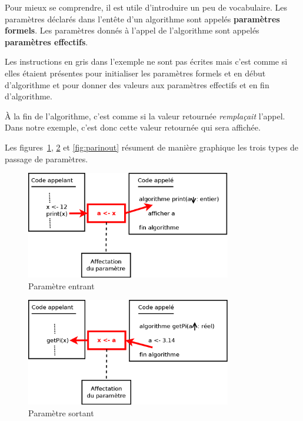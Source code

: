 	Pour mieux se comprendre,
	il est utile d’introduire un peu de vocabulaire.
	Les paramètres déclarés dans l’entête d’un algorithme
	sont appelés \textbf{paramètres formels}.
	Les paramètres donnés à l’appel de l’algorithme
	sont appelés \textbf{paramètres effectifs}. 
	
	Les instructions en gris dans l’exemple ne sont pas écrites
	mais c’est comme si elles étaient présentes
	pour initialiser les paramètres formels \In{} et \InOut{}
	en début d’algorithme
	et pour donner des valeurs 
	aux paramètres effectifs \Out{} et \InOut{}
	en fin d’algorithme.
	
	À la fin de l’algorithme, 
	c’est comme si la valeur retournée \emph{remplaçait} l’appel.
	Dans notre exemple, c’est donc cette valeur retournée
	qui sera affichée.
	
	Les figures~\ref{fig:parin}, \ref{fig:parout} et \ref{fig:parinout}
	résument de manière graphique les trois types de passage de paramètres.

	\begin{figure}[!h]
		\begin{center}
		\includegraphics[width=0.8\textwidth]{image/figure-parametres-entrants}
	    \caption{Paramètre entrant}
	    \label{fig:parin}
		\end{center}
	\end{figure}

	\begin{figure}[!h]
		\begin{center}
		\includegraphics[width=0.8\textwidth]{image/figure-parametres-sortants}
	    \caption{Paramètre sortant}
	    \label{fig:parout}
		\end{center}
	\end{figure}

